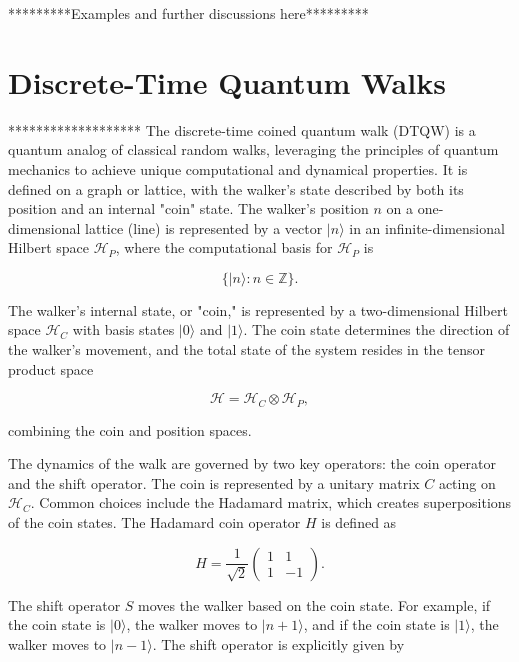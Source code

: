 \documentclass[11pt]{article}
\theoremstyle{definition}
\begin{document}
*********Examples and further discussions here*********






\section*{Discrete-Time Quantum Walks}
*******************
The discrete-time coined quantum walk (DTQW) is a quantum analog of classical random walks, leveraging the principles of quantum mechanics to achieve unique computational and dynamical properties. It is defined on a graph or lattice, with the walker's state described by both its position and an internal "coin" state. The walker's position \( n \) on a one-dimensional lattice (line) is represented by a vector \( |n\rangle \) in an infinite-dimensional Hilbert space \( \mathcal{H}_P \), where the computational basis for \( \mathcal{H}_P \) is 

\[
\{ |n\rangle : n \in \mathbb{Z} \}.
\]

The walker's internal state, or "coin," is represented by a two-dimensional Hilbert space \( \mathcal{H}_C \) with basis states \( |0\rangle \) and \( |1\rangle \). The coin state determines the direction of the walker's movement, and the total state of the system resides in the tensor product space 

\[
\mathcal{H} = \mathcal{H}_C \otimes \mathcal{H}_P,
\]

combining the coin and position spaces.

The dynamics of the walk are governed by two key operators: the coin operator and the shift operator. The coin is represented by a unitary matrix \( C \) acting on \( \mathcal{H}_C \). Common choices include the Hadamard matrix, which creates superpositions of the coin states. The Hadamard coin operator \( H \) is defined as 

\[
H = \frac{1}{\sqrt{2}} \begin{pmatrix} 1 & 1 \\ 1 & -1 \end{pmatrix}.
\]

The shift operator \( S \) moves the walker based on the coin state. For example, if the coin state is \( |0\rangle \), the walker moves to \( |n+1\rangle \), and if the coin state is \( |1\rangle \), the walker moves to \( |n-1\rangle \). The shift operator is explicitly given by 
\end{document}
